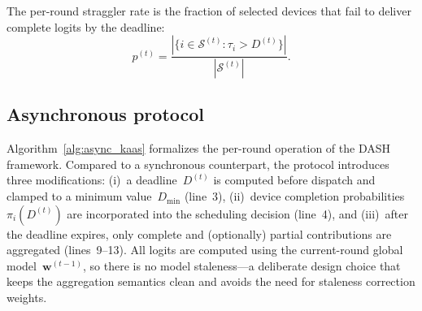 \documentclass[a4paper,fleqn]{cas-dc}
\newcommand{\Sset}{\mathcal{S}}
\begin{document}
	\begin{definition}\label{def:straggler_rate}
		The per-round straggler rate is the fraction of selected devices that
		fail to deliver complete logits by the deadline:
		\begin{equation}\label{eq:straggler_rate}
			p^{(t)} = \frac{|\{i \in \Sset^{(t)} :
				\tau_i > D^{(t)}\}|}{|\Sset^{(t)}|}.
		\end{equation}
	\end{definition}
	
	\subsection{Asynchronous protocol}\label{sec:async_protocol}
	
	Algorithm~\ref{alg:async_kaas} formalizes the per-round operation of
	the DASH framework.  Compared to a synchronous counterpart, the
	protocol introduces three modifications: (i)~a deadline~$D^{(t)}$ is
	computed before dispatch and clamped to a minimum
	value~$D_{\min}$ (line~3), (ii)~device completion
	probabilities $\pi_i(D^{(t)})$ are incorporated into the scheduling
	decision (line~4), and (iii)~after the deadline expires, only complete
	and (optionally) partial contributions are aggregated
	(lines~9--13).  All logits are computed using the current-round
	global model~$\mathbf{w}^{(t-1)}$, so there is no model
	staleness---a deliberate design choice that keeps the aggregation
	semantics clean and avoids the need for staleness correction weights.
	
\end{document}
